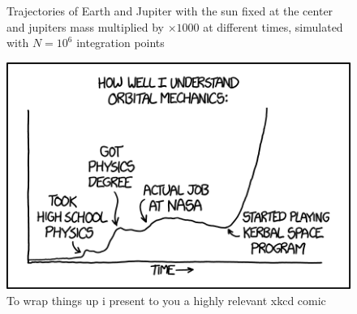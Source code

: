 \documentclass[10pt,showpacs,preprintnumbers,amsmath,amssymb,nofootinbib,aps,prl,twocolumn,groupedaddress,superscriptaddress,showkeys]{revtex4-1}
\begin{document}
\begin{figure}[h!]
    \caption{Trajectories of Earth and Jupiter with the sun fixed at the center and jupiters mass multiplied by $\times 1000$ at different times, simulated with $N=10^6$ integration points}
    \label{fig:ex_e earth slingshot}
  \end{figure}


\begin{figure}[h!]
  \center
  \includegraphics[scale=0.5]{figs/orbital_mechanics.png}
  \caption{To wrap things up i present to you a highly relevant xkcd comic}
\end{figure}
\end{document}
